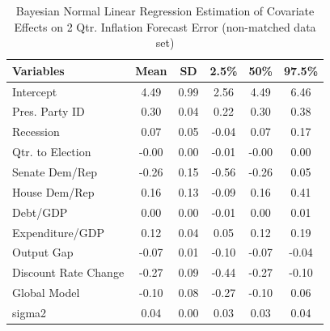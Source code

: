 \documentclass[a4paper]{article}\usepackage{graphicx, color}
\begin{document}
\begin{table}[ht]
\begin{center}
\caption{Bayesian Normal Linear Regression Estimation of Covariate Effects on 2 Qtr. Inflation Forecast Error (non-matched data set)}
\label{OutputNB}
{\small
\begin{tabular}{lccccc}
  \hline
Variables & Mean & SD & 2.5\% & 50\% & 97.5\% \\ 
  \hline
Intercept & 4.49 & 0.99 & 2.56 & 4.49 & 6.46 \\ 
  Pres. Party ID & 0.30 & 0.04 & 0.22 & 0.30 & 0.38 \\ 
  Recession & 0.07 & 0.05 & -0.04 & 0.07 & 0.17 \\ 
  Qtr. to Election & -0.00 & 0.00 & -0.01 & -0.00 & 0.00 \\ 
  Senate Dem/Rep & -0.26 & 0.15 & -0.56 & -0.26 & 0.05 \\ 
  House Dem/Rep & 0.16 & 0.13 & -0.09 & 0.16 & 0.41 \\ 
  Debt/GDP & 0.00 & 0.00 & -0.01 & 0.00 & 0.01 \\ 
  Expenditure/GDP & 0.12 & 0.04 & 0.05 & 0.12 & 0.19 \\ 
  Output Gap & -0.07 & 0.01 & -0.10 & -0.07 & -0.04 \\ 
  Discount Rate Change & -0.27 & 0.09 & -0.44 & -0.27 & -0.10 \\ 
  Global Model & -0.10 & 0.08 & -0.27 & -0.10 & 0.06 \\ 
  sigma2 & 0.04 & 0.00 & 0.03 & 0.03 & 0.04 \\ 
   \hline
\end{tabular}
}
\end{center}
\end{table}





\end{document}
